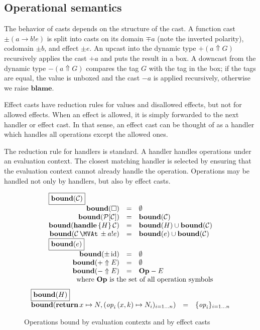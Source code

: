 \subsection{Operational semantics}

The behavior of casts depends on the structure of the cast.
A function cast $\pm (a \to b ! e)$
is split into casts on its domain $\mp a$ (note the inverted polarity), codomain $\pm b$, and effect $\pm e$.
An upcast into the dynamic type $+ (a \Uparrow G)$
recursively applies the cast $+ a$ and puts the result in a box.
A downcast from the dynamic type $- (a \Uparrow G)$ compares
the tag $G$ with the tag in the box; if the tags are equal, the value is
unboxed and the cast $- a$ is applied recursively,
otherwise we raise $\mathbf{blame}$.

Effect casts have reduction rules for values and disallowed effects,
but not for allowed effects. When an effect is allowed, it is simply
forwarded to the next handler or effect cast. In that sense,
an effect cast can be thought of as a handler which handles all operations
except the allowed ones.

The reduction rule for handlers is standard. A handler handles operations under an
evaluation context. The closest matching handler is selected by ensuring that
the evaluation context cannot already handle the operation.
Operations may be handled not only by handlers, but also by effect casts.



\begin{figure}
\[
\begin{array}{rcl}
\multicolumn{3}{l}{\fbox{$\bound{\xC}$}} \\
  \bound{\square} & = & \emptyset \\
  \bound{\context{\xP}{\xC}} & = & \bound{\xC} \\
  \bound{\handle{H}{\xC}} & = & \bound{H} \cup \bound{\xC} \\
  \bound{\cast{\xC}{\pm \cty{e}{a}}} & = & \bound{e} \cup \bound{\xC} \\
\multicolumn{3}{l}{\fbox{$\bound{e}$}} \\
  \bound{\pm\, \cid} & = & \emptyset \\
  \bound{+ \Uparrow E} & = & \emptyset \\
  \bound{- \Uparrow E} & = & \mathbf{Op} - E \\
  && \quad \makebox[0pt]{\text{where $\mathbf{Op}$ is the set of all operation symbols} }
\end{array}
\]
\[
\begin{array}{rcl}
\multicolumn{3}{l}{\fbox{$\bound{H}$}} \\
  \bound{\treturn{x}\mapsto N, \fori{i}{n}{\perform{\effop_i}{x,k} \mapsto N_i}}
    &=& \foriset{i}{n}{\effop_i}
\end{array}
\]
\caption{Operations bound by evaluation contexts and by effect casts}
\end{figure}

